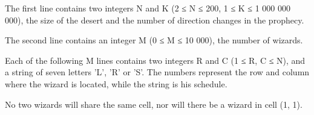 The first line contains two integers N and K (2 ≤ N ≤ 200, 1 ≤ K ≤ 1 000 000 000), the size of the desert and the number of direction changes in the prophecy.  

   The second line contains an integer M (0 ≤ M ≤ 10 000), the number of wizards.  

   Each of the following M lines contains two integers R and C (1 ≤ R, C ≤ N), and a string of seven letters 'L', 'R' or 'S'. The numbers represent the row and column where the wizard is located, while the string is his schedule.  

   No two wizards will share the same cell, nor will there be a wizard in cell (1, 1).